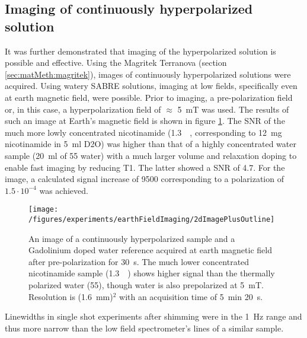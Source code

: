     \subsection{Imaging of continuously hyperpolarized solution}
    It was further demonstrated that imaging of the hyperpolarized solution is possible and effective.
    Using the Magritek Terranova (section \ref{sec:matMeth:magritek}), images of continuously hyperpolarized solutions were acquired. Using watery SABRE solutions, imaging at low fields, specifically even at earth magnetic field, were possible. Prior to imaging, a pre-polarization field or, in this case, a hyperpolarization field of $\approx$ \SI{5}{\milli\tesla} was used. The results of such an image at Earth's magnetic field is shown in figure \ref{fig:results:earthFieldImage}.  The SNR of the much more lowly concentrated nicotinamide (\SI{1.3}{\milli\Molar}, corresponding to \SI{12}{\milli\gram} nicotinamide in \SI{5}{\milli\litre} D2O) was higher than that of a highly concentrated water sample (\SI{20}{\milli\litre} of \SI{55}{\Molar} water) with a much larger volume and relaxation doping to enable fast imaging by reducing T1. The latter showed a SNR of 4.7. For the image, a calculated signal increase of 9500 corresponding to a polarization of $1.5\cdot 10^{-4}$ was achieved.
    \begin{figure}
            \texttt{[image: /figures/experiments/earthFieldImaging/2dImagePlusOutline]}
            \caption[Earth field SABRE image]{An image of a continuously hyperpolarized sample and a Gadolinium doped water reference acquired at earth magnetic field after pre-polarization for \SI{30}{\second}. The much lower concentrated nicotinamide sample (\SI{1.3}{\milli\Molar}) shows higher signal than the thermally polarized water (\SI{55}{\Molar}), though water is also prepolarized at \SI{5}{\milli\tesla}. Resolution is (\SI{1.6}{\milli\meter})$^2$ with an acquisition time of \SI{5}{\minute} \SI{20}{\second}.}
            \label{fig:results:earthFieldImage}
        \end{figure}
        Linewidths in single shot experiments after shimming were in the \SI{1}{\hertz} range and thus more narrow than the low field spectrometer's lines of a similar sample. 
